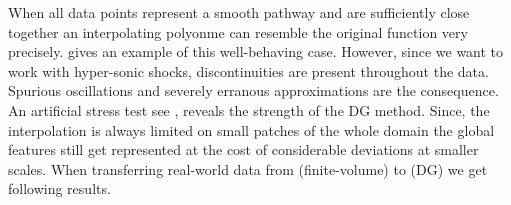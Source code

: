When all data points represent a smooth pathway and are sufficiently close
together an interpolating polyonme can resemble the original function very
precisely.  gives an example of this well-behaving
case.
However, since we want to work with hyper-sonic shocks, discontinuities are
present throughout the data. Spurious oscillations and severely erranous
approximations are the consequence. An artificial stress test
see , reveals the strength of the DG method. Since,
the interpolation is always limited on small patches of the whole domain
the global features still get represented at the cost of considerable deviations
at smaller scales.
When transferring real-world data from \FLASH (finite-volume) to \FLEXI (DG) we get
following results.




